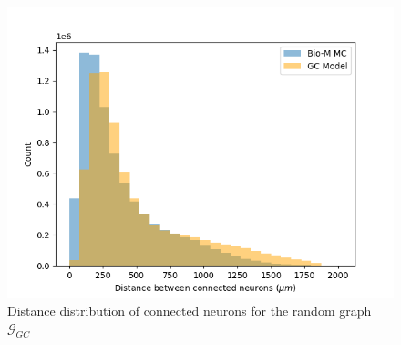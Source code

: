 \begin{figure}[H]
\begin{center}
\captionsetup{justification=centering}
\includegraphics[width=12cm]{GC/GC_dist_distr.png}
\caption{Distance distribution of connected neurons for the random graph $\mathcal{G}_{GC}$}
\end{center}
\end{figure}

